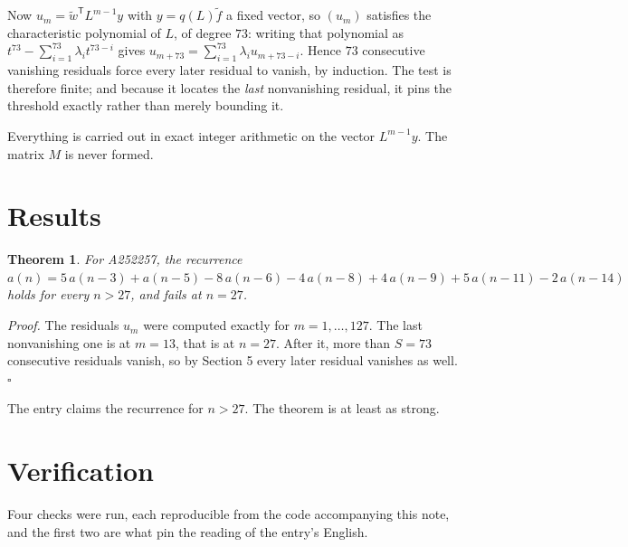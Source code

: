 \documentclass[11pt]{article}
\newtheorem{theorem}{Theorem}
\theoremstyle{definition}
\begin{document}
Now $u_m = \tilde w^{\mathsf T} L^{m-1} y$ with $y = q(L)\tilde f$ a fixed vector, so $(u_m)$ satisfies the characteristic polynomial of $L$, of degree $73$: writing that polynomial as $t^{73} - \sum_{i=1}^{73} \lambda_i t^{73-i}$ gives $u_{m+73} = \sum_{i=1}^{73} \lambda_i u_{m+73-i}$. Hence $73$ consecutive vanishing residuals force every later residual to vanish, by induction. The test is therefore finite; and because it locates the {\itshape last} nonvanishing residual, it pins the threshold exactly rather than merely bounding it.

Everything is carried out in exact integer arithmetic on the vector $L^{m-1}y$. The matrix $M$ is never formed.

\section{Results}

\begin{theorem} For A252257, the recurrence $a(n) = 5\,a(n-3) + a(n-5) - 8\,a(n-6) - 4\,a(n-8) + 4\,a(n-9) + 5\,a(n-11) - 2\,a(n-14)$ holds for every $n > 27$, and fails at $n = 27$.\end{theorem}

{\itshape Proof.} The residuals $u_m$ were computed exactly for $m = 1,\dots,127$. The last nonvanishing one is at $m = 13$, that is at $n = 27$. After it, more than $S = 73$ consecutive residuals vanish, so by Section 5 every later residual vanishes as well. $\square$

The entry claims the recurrence for $n > 27$. The theorem is at least as strong.

\section{Verification}

Four checks were run, each reproducible from the code accompanying this note, and the first two are what pin the reading of the entry's English.
\end{document}
